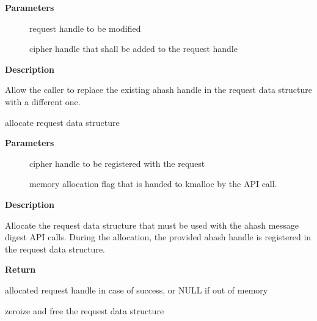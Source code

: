 \documentclass[a4paper,8pt,english]{sphinxmanual}
\begin{document}
\textbf{Parameters}
\begin{description}
\item[{}] \leavevmode
request handle to be modified

\item[{}] \leavevmode
cipher handle that shall be added to the request handle

\end{description}

\textbf{Description}

Allow the caller to replace the existing ahash handle in the request
data structure with a different one.

\begin{fulllineitems}
\label{crypto/api-digest:c.ahash_request_alloc}
allocate request data structure

\end{fulllineitems}


\textbf{Parameters}
\begin{description}
\item[{}] \leavevmode
cipher handle to be registered with the request

\item[{}] \leavevmode
memory allocation flag that is handed to kmalloc by the API call.

\end{description}

\textbf{Description}

Allocate the request data structure that must be used with the ahash
message digest API calls. During
the allocation, the provided ahash handle
is registered in the request data structure.

\textbf{Return}

allocated request handle in case of success, or NULL if out of memory

\begin{fulllineitems}
\label{crypto/api-digest:c.ahash_request_free}
zeroize and free the request data structure

\end{fulllineitems}
\end{document}
